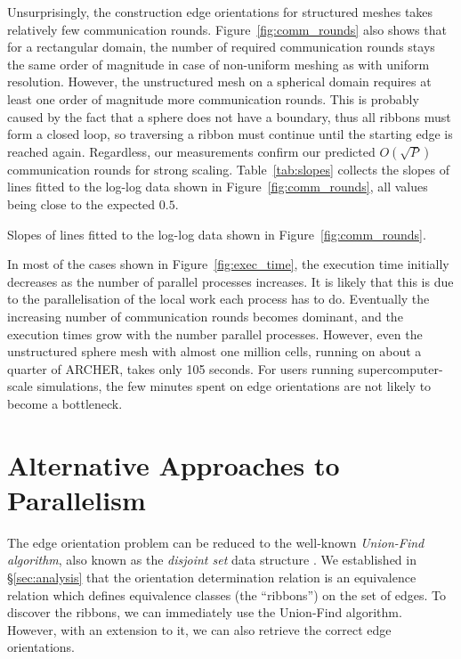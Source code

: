 \documentclass[oneeqnum,onethmnum,onefignum,onetabnum]{siamltex1213}
\begin{document}
Unsurprisingly, the construction edge orientations for structured
meshes takes relatively few communication rounds.
Figure~\ref{fig:comm_rounds} also shows that for a rectangular domain,
the number of required communication rounds stays the same order of
magnitude in case of non-uniform meshing as with uniform resolution.
However, the unstructured mesh on a spherical domain requires at least
one order of
magnitude more communication rounds. This is probably caused by the
fact that a sphere does not have a boundary, thus all ribbons must
form a closed loop, so traversing a ribbon must continue until the
starting edge is reached again. Regardless, our measurements confirm
our predicted $ O(\sqrt{P}) $ communication rounds for strong
scaling. Table~\ref{tab:slopes} collects the slopes of lines fitted to
the log-log data shown in Figure~\ref{fig:comm_rounds}, all values
being close to the expected $ 0.5 $.

\begin{table}
  \centering
  \caption{Slopes of lines fitted to the log-log data shown in Figure~\ref{fig:comm_rounds}.}
  \label{tab:slopes}
\end{table}

In most of the cases shown in Figure~\ref{fig:exec_time}, the execution time
initially decreases as the number of parallel processes increases. It is
likely that this is due to the parallelisation of the local work each
process has to do. Eventually the increasing number of communication
rounds becomes dominant, and the execution times grow with the number
parallel processes. However, even the unstructured sphere mesh with
almost one million cells, running on about a quarter of ARCHER, takes only
105 seconds. For users running supercomputer-scale simulations, the
few minutes spent on edge orientations are not likely to become a
bottleneck.

\section{Alternative Approaches to Parallelism}
\label{sec:union-find}

The edge orientation problem can be reduced to the well-known
\emph{Union-Find algorithm}, also known as the \emph{disjoint set} data
structure \cite{Cormen2001}.  We established in \S\ref{sec:analysis}
that the orientation determination relation is an equivalence relation
which defines equivalence classes (the ``ribbons'') on the set of edges.
To discover the ribbons, we can immediately use the Union-Find
algorithm. However, with an extension to it, we can also retrieve the
correct edge orientations.
\end{document}
